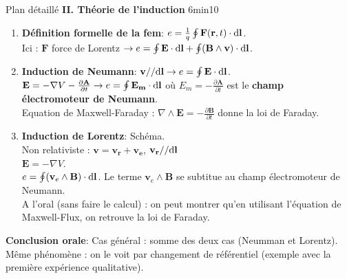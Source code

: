 \begin{reportBlock}{Plan détaillé}
\vspace{1cm}
\textbf{II. Théorie de l'induction} 6min10
\begin{enumerate}
    \item \textbf{Définition formelle de la fem}: $e = \frac{1}{q} \oint \mathbf F(\mathbf r, t) \cdot \mathrm{d} \mathbf l$. \\
    Ici : $\mathbf F$ force de Lorentz $\rightarrow e = \oint \mathbf E \cdot \mathrm{d} \mathbf l + \oint (\mathbf B \land \mathbf v) \cdot \mathrm{d} \mathbf l$.
    \item \textbf{Induction de Neumann}: $\mathbf v \slash\slash
 \mathrm{d} \mathbf l \rightarrow e = \oint \mathbf E \cdot \mathrm{d} \mathbf l$. \\
 $\mathbf E = - \nabla V - \frac{\partial \mathbf A}{\partial t} \rightarrow e = \oint \mathbf{E_m} \cdot \mathrm{d} \mathbf l $ où $E_m = - \frac{\partial \mathbf A}{\partial t}$ est le \textbf{champ électromoteur de Neumann}. \\
 Equation de Maxwell-Faraday : $\nabla \land \mathbf E = - \frac{\partial \mathbf B}{\partial t}$ donne la loi de Faraday.
    
    \item \textbf{Induction de Lorentz}: Schéma. \\
    Non relativiste : $\mathbf v = \mathbf{v_r} + \mathbf{v_e}$, $\mathbf{v_r} \slash\slash \mathrm{d} \mathbf l$ \\
    $\mathbf E = - \nabla V$. \\
    $e = \oint (\mathbf v_e \land \mathbf B) \cdot \mathrm{d} \mathbf l$. Le terme $\mathbf v_e \land \mathbf B$ se subtitue au champ électromoteur de Neumann. \\
    A l'oral (sans faire le calcul) : on peut montrer qu'en utilisant l'équation de Maxwell-Flux, on retrouve la loi de Faraday.
\end{enumerate}
\textbf{Conclusion orale}: Cas général : somme des deux cas (Neumman et Lorentz). Même phénomène : on le voit par changement de référentiel (exemple avec la première expérience qualitative).


\end{reportBlock}
